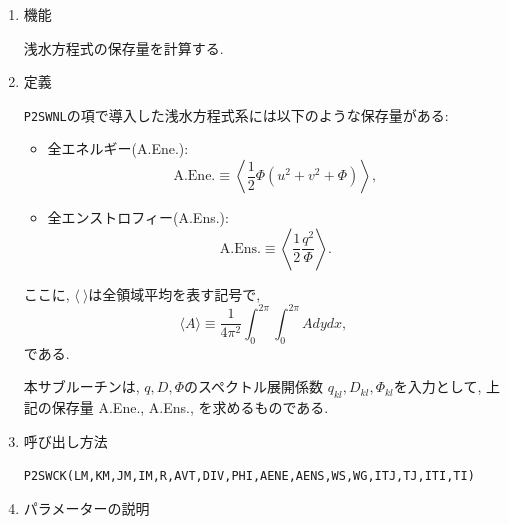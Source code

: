 \documentclass[a4j,fleqn]{jarticle}
\begin{document}
\begin{enumerate}

\item 機能

浅水方程式の保存量を計算する.

\item 定義

{\tt P2SWNL}の項で導入した浅水方程式系には以下のような保存量がある:
\begin{itemize}
\item 全エネルギー(A.Ene.):
\begin{equation}
\mbox{A.Ene.}\equiv\left\langle\frac12\Phi(u^2+v^2+\Phi)\right\rangle,
\end{equation}
\item 全エンストロフィー(A.Ens.):
\begin{equation}
\mbox{A.Ens.}\equiv\left\langle\frac12\frac{q^2}{\Phi}\right\rangle.
\end{equation}
\end{itemize}
ここに, $\langle\ \rangle$は全領域平均を表す記号で,
\begin{equation}
\langle A\rangle\equiv\frac1{4\pi^2}\int^{2\pi}_0\int^{2\pi}_0 A dy dx,
\end{equation}
である.

本サブルーチンは, $q,D,\Phi$のスペクトル展開係数
$q_{kl},D_{kl},\Phi_{kl}$を入力として, 
上記の保存量 A.Ene., A.Ens.,
を求めるものである.

\item 呼び出し方法 

{\tt P2SWCK(LM,KM,JM,IM,R,AVT,DIV,PHI,AENE,AENS,WS,WG,ITJ,TJ,ITI,TI)}
  
\item パラメーターの説明


\end{enumerate}
\end{document}
